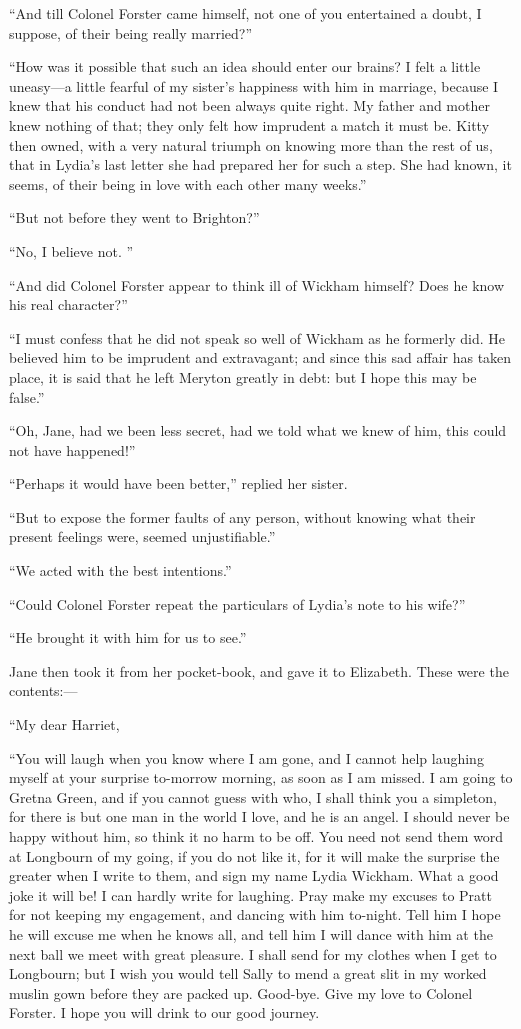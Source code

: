 \documentclass[10pt]{book}
\begin{document}
   “And till Colonel Forster came himself, not one of you entertained a
doubt, I suppose, of their being really married?”
  

   “How was it possible that such an idea should enter our brains? I felt a
little uneasy—a little fearful of my sister’s happiness with him in
marriage, because I knew that his conduct had not been always quite
right. My father and mother knew nothing of that; they only felt how
imprudent a match it must be. Kitty then owned, with a very natural
triumph on knowing more than the rest of us, that in Lydia’s last letter
she had prepared her for such a step. She had known, it seems, of their
being in love with each other many weeks.”
  

   “But not before they went to Brighton?”
  

   “No, I believe not.
   ”
  

   “And did Colonel Forster appear to think ill of Wickham himself? Does he
know his real character?”
  

   “I must confess that he did not speak so well of Wickham as he formerly
did. He believed him to be imprudent and extravagant; and since this sad
affair has taken place, it is said that he left Meryton greatly in debt:
but I hope this may be false.”
  

   “Oh, Jane, had we been less secret, had we told what we knew of him,
this could not have happened!”
  

   “Perhaps it would have been better,” replied her sister.
  

   “But to expose the former faults of any person, without knowing what
their present feelings were, seemed unjustifiable.”
  

   “We acted with the best intentions.”
  

   “Could Colonel Forster repeat the particulars of Lydia’s note to his
wife?”
  

   “He brought it with him for us to see.”
  

   Jane then took it from her pocket-book, and gave it to Elizabeth. These
were the contents:—
  

    “My dear Harriet,
   

    “You will laugh when you know where I am gone, and I cannot help
laughing myself at your surprise to-morrow morning, as soon as I am
missed. I am going to Gretna Green, and if you cannot guess with
who, I shall think you a simpleton, for there is but one man in the
world I love, and he is an angel. I should never be happy without
him, so think it no harm to be off. You need not send them word at
Longbourn of my going, if you do not like it, for it will make the
surprise the greater when I write to them, and sign my name Lydia
Wickham. What a good joke it will be! I can hardly write for
laughing. Pray make my excuses to Pratt for not keeping my
engagement, and dancing with him to-night.
    Tell him I hope he will
excuse me when he knows all, and tell him I will dance with him at
the next ball we meet with great pleasure. I shall send for my
clothes when I get to Longbourn; but I wish you would tell Sally to
mend a great slit in my worked muslin gown before they are packed
up. Good-bye. Give my love to Colonel Forster. I hope you will
drink to our good journey.
   
\end{document}
